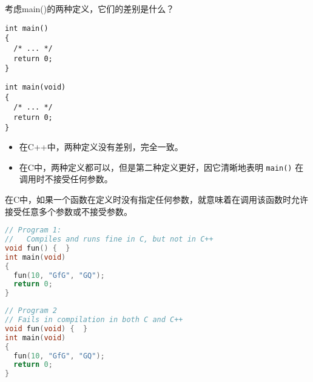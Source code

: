 \begin{frame}[fragile]
  考虑main()的两种定义，它们的差别是什么？
  \begin{minipage}{0.45\linewidth}
  \begin{lstlisting}
int main()
{
  /* ... */
  return 0;
}
  \end{lstlisting}
  \end{minipage}\hfill
  \begin{minipage}{0.45\linewidth}
  \begin{lstlisting}
int main(void)
{
  /* ... */
  return 0;
}
  \end{lstlisting}
    
  \end{minipage}

  \pause
  \begin{itemize}
  \item  在C++中，两种定义没有差别，完全一致。\\[.1in]
  \item  在C中，两种定义都可以，但是第二种定义更好，因它清晰地表明 \lstinline|main()| 在调用时不接受任何参数。    
  \end{itemize}
  \pause 
  \begin{free}[注意]{}
    在C中，如果一个函数在定义时没有指定任何参数，就意味着在调用该函数时允许接受任意多个参数或不接受参数。
  \end{free}
\end{frame}

\begin{frame}[fragile]
  \begin{lstlisting}[language=c,frame=single]
// Program 1:
//   Compiles and runs fine in C, but not in C++
void fun() {  } 
int main(void)
{
  fun(10, "GfG", "GQ");
  return 0;
}
  \end{lstlisting}
  \pause
  \begin{lstlisting}[language=c,frame=single]
// Program 2
// Fails in compilation in both C and C++
void fun(void) {  }
int main(void)
{
  fun(10, "GfG", "GQ");
  return 0;
}
  \end{lstlisting}
\end{frame}


